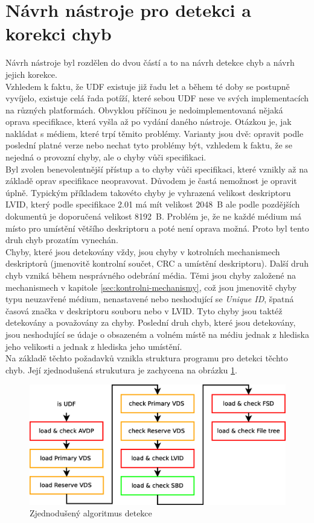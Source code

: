 \section{Návrh nástroje pro detekci a korekci chyb}
\label{sec:navrh}
Návrh nástroje byl rozdělen do dvou částí a to na návrh detekce chyb a návrh jejich korekce.\\
Vzhledem k faktu, že UDF existuje již řadu let a během té doby se postupně vyvíjelo, existuje celá řada potíží, které sebou UDF nese ve svých implementacích na různých platformách. Obvyklou příčinou je nedoimplementovaná nějaká oprava specifikace, která vyšla až po vydání daného nástroje. Otázkou je, jak nakládat s médiem, které trpí těmito problémy. Varianty jsou dvě: opravit podle poslední platné verze nebo nechat tyto problémy být, vzhledem k faktu, že se nejedná o provozní chyby, ale o chyby vůči specifikaci.\\
Byl zvolen benevolentnější přístup a to chyby vůči specifikaci, které vznikly až na základě oprav specifikace neopravovat. Důvodem je častá nemožnost je opravit úplně. Typickým příkladem takovéto chyby je vyhrazená velikost deskriptoru LVID, který podle specifikace 2.01 má mít velikost 2048~B ale podle pozdějších dokumentů je doporučená velikost 8192~B. Problém je, že ne každé médium má místo pro umístění většího deskriptoru a poté není oprava možná. Proto byl tento druh chyb prozatím vynechán.\\
Chyby, které jsou detekovány vždy, jsou chyby v kotrolních mechanismech deskriptorů (jmenovitě kontrolní součet, CRC a umístění deskriptoru). Další druh chyb vzniká během nesprávného odebrání média. Těmi jsou chyby založené na mechanismech v kapitole \ref{sec:kontrolni-mechanismy}, což jsou jmenovitě chyby typu neuzavřené médium, nenastavené nebo neshodující se \textit{Unique ID}, špatná časová značka v deskriptoru souboru nebo v LVID. Tyto chyby jsou taktéž detekovány a považovány za chyby. Poslední druh chyb, které jsou detekovány, jsou neshodující se údaje o obsazeném a volném místě na médiu jednak z hlediska jeho velikosti a jednak z hlediska jeho umístění.\\
Na základě těchto požadavků vznikla struktura programu pro detekci těchto chyb. Její zjednodušená strukutura je zachycena na obrázku \ref{fig:steps-detekce}.\\ 
\begin{figure}[h] 
    \centering
    \includegraphics[scale=0.4]{obrazky/steps1b.eps}
    \caption{Zjednodušený algoritmus detekce}
    \label{fig:steps-detekce}
\end{figure}
